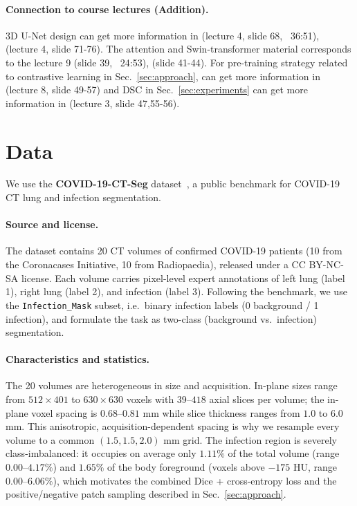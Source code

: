 \documentclass{article}
\begin{document}
\paragraph{Connection to course lectures (Addition).}
3D U-Net design can get more information in {(lecture 4, slide 68, ~36:51)}, {(lecture 4, slide 71-76)}. The attention and Swin-transformer material corresponds to the lecture 9 {(slide 39, ~24:53)}, {(slide 41-44)}. For pre-training strategy related to contrastive learning in Sec.~\ref{sec:approach}, can get more information in {(lecture 8, slide 49-57)} and DSC in Sec.~\ref{sec:experiments} can get more information in {(lecture 3, slide 47,55-56)}.
\section{Data}
\label{sec:data}

We use the \textbf{COVID-19-CT-Seg} dataset~\citep{ma2021benchmark,zenodo2020ctseg}, a public benchmark for COVID-19 CT lung and infection segmentation.

\paragraph{Source and license.}
The dataset contains 20 CT volumes of confirmed COVID-19 patients (10 from the Coronacases Initiative, 10 from Radiopaedia), released under a CC BY-NC-SA license. Each volume carries pixel-level expert annotations of left lung (label 1), right lung (label 2), and infection (label 3). Following the benchmark, we use the \texttt{Infection\_Mask} subset, i.e.\ binary infection labels (0 background / 1 infection), and formulate the task as two-class (background vs.\ infection) segmentation.

\paragraph{Characteristics and statistics.}
The 20 volumes are heterogeneous in size and acquisition. In-plane sizes range from $512\times401$ to $630\times630$ voxels with $39$--$418$ axial slices per volume; the in-plane voxel spacing is $0.68$--$0.81$ mm while slice thickness ranges from $1.0$ to $6.0$ mm. This anisotropic, acquisition-dependent spacing is why we resample every volume to a common $(1.5, 1.5, 2.0)$ mm grid. The infection region is severely class-imbalanced: it occupies on average only $1.11\%$ of the total volume (range $0.00$--$4.17\%$) and $1.65\%$ of the body foreground (voxels above $-175$ HU, range $0.00$--$6.06\%$), which motivates the combined Dice + cross-entropy loss and the positive/negative patch sampling described in Sec.~\ref{sec:approach}.
\end{document}
